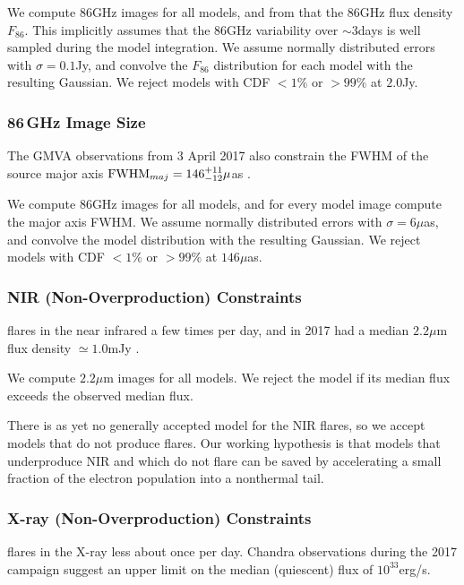 We compute 86GHz images for all models, and from that the 86GHz flux density $F_{86}$.  This implicitly assumes that the 86GHz variability over $\sim 3$days is well sampled during the model integration.  We assume normally distributed errors with $\sigma = 0.1$Jy, and convolve the $F_{86}$ distribution for each model with the resulting Gaussian.  We reject models with CDF $< 1\%$ or $> 99\%$ at $2.0$Jy.

\subsubsection{86\,GHz Image Size}

The GMVA observations from 3 April 2017 also constrain the FWHM of the source major axis ${\rm FWHM}_{maj} = 146^{+11}_{-12}\mu$as \citep[95\% confidence][]{2021ApJ...915...99I}.

We compute 86GHz images for all models, and for every model image compute the major axis FWHM.  We assume normally distributed errors with $\sigma = 6\mu$as, and convolve the model distribution with the resulting Gaussian.  We reject models with CDF $< 1\%$ or $> 99\%$ at $146\mu$as.

\subsubsection{NIR (Non-Overproduction) Constraints}

\sgra flares in the near infrared a few times per day, and in 2017 had a median $2.2\mu$m flux density $\simeq 1.0$mJy \citep{2020A&A...638A...2G}.

We compute $2.2\mu$m images for all models.  We reject the model if its median flux exceeds the observed median flux.  

There is as yet no generally accepted model for the NIR flares, so we accept models that do not produce flares. Our working hypothesis is that models that underproduce NIR and which do not flare can be saved by accelerating a small fraction of the electron population into a nonthermal tail.  

\subsubsection{X-ray (Non-Overproduction) Constraints}

\sgra flares in the X-ray less about once per day.  Chandra observations during the 2017 campaign suggest an upper limit on the median (quiescent) flux of $10^{33}$erg/s.  

